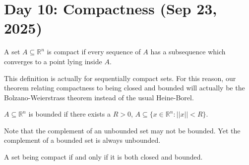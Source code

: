 \section{Day 10: Compactness (Sep 23, 2025)}

\begin{definition}[Compactness]
A set $A \subseteq \mathbb{R}^n$ is compact if every sequence of $A$ has a subsequence which converges to a point lying inside $A$. 
\end{definition}

This definition is actually for sequentially compact sets. For this reason, our theorem relating compactness to being closed and bounded will actually be the Bolzano-Weierstrass theorem instead of the usual Heine-Borel.

\begin{definition}[Boundedness]
    $A \subseteq \mathbb{R}^n$ is bounded if there exists a $R > 0$, $A \subseteq \{ x \in \mathbb{R}^n : ||x|| < R \}$.
\end{definition}

Note that the complement of an unbounded set may not be bounded. Yet the complement of a bounded set is always unbounded.

\begin{theorem}
A set being compact if and only if it is both closed and bounded.
\end{theorem}

